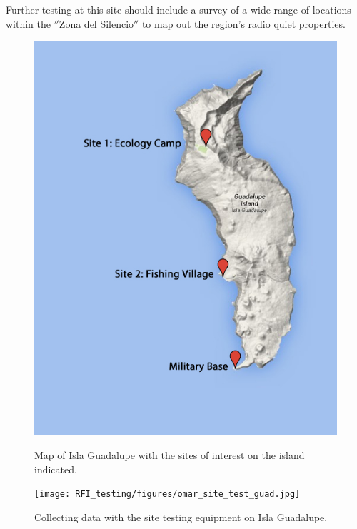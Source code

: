 Further testing at this site should include a survey of a wide range of locations within the $''$Zona del Silencio$''$ to map out the region's radio quiet properties. 

\begin{figure}[htb]
\centering
\begin{minipage}[b]{0.45\textwidth}
\centering
\includegraphics[width=0.95\linewidth]{RFI_testing/figures/isla_guadalupe_site_map.jpg}
\caption{Map of Isla Guadalupe with the sites of interest on the island indicated.}
\label{Fig:guadmap}
\end{minipage}%
\begin{minipage}[b]{0.02\textwidth}
\hspace{1cm}
\end{minipage}%
\begin{minipage}[b]{0.49\textwidth}
\centering
\texttt{[image: RFI\_testing/figures/omar\_site\_test\_guad.jpg]}
\caption{Collecting data with the site testing equipment on Isla Guadalupe.}
\label{Fig:guadsite}
\end{minipage}
\end{figure}


